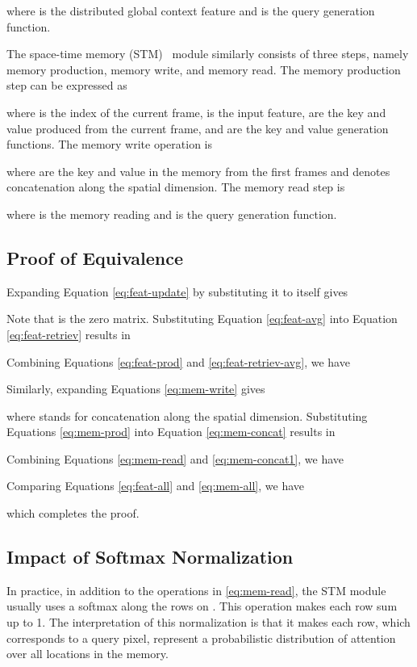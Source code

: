 \documentclass[runningheads]{llncs}
\begin{document}
where  is the distributed global context feature and  is the query generation function.

The space-time memory (STM)~\cite{stm} module similarly consists of three steps, namely memory production, memory write, and memory read. The memory production step can be expressed as

where  is the index of the current frame,  is the input feature,  are the key and value produced from the current frame, and  are the key and value generation functions. The memory write operation is

where  are the key and value in the memory from the first  frames and  denotes concatenation along the spatial dimension. The memory read step is

where  is the memory reading and  is the query generation function.

\subsection{Proof of Equivalence}

Expanding Equation \eqref{eq:feat-update} by substituting it to itself gives

Note that  is the zero matrix. Substituting Equation \eqref{eq:feat-avg} into Equation \eqref{eq:feat-retriev} results in

Combining Equations \eqref{eq:feat-prod} and \eqref{eq:feat-retriev-avg}, we have


Similarly, expanding Equations \eqref{eq:mem-write} gives

where  stands for concatenation along the spatial dimension. Substituting Equations \eqref{eq:mem-prod} into Equation \eqref{eq:mem-concat} results in

Combining Equations \eqref{eq:mem-read} and \eqref{eq:mem-concat1}, we have

Comparing Equations \eqref{eq:feat-all} and \eqref{eq:mem-all}, we have

which completes the proof.

\subsection{Impact of Softmax Normalization}

In practice, in addition to the operations in \eqref{eq:mem-read}, the STM module usually uses a softmax along the rows on . This operation makes each row sum up to 1. The interpretation of this normalization is that it makes each row, which corresponds to a query pixel, represent a probabilistic distribution of attention over all locations in the memory.
\end{document}

